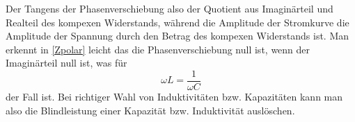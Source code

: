 Der Tangens der Phasenverschiebung also der Quotient aus Imaginärteil und Realteil des kompexen Widerstands, während die Amplitude der Stromkurve die Amplitude der Spannung durch den Betrag des kompexen Widerstands ist.
Man erkennt in \ref{Zpolar} leicht das die Phasenverschiebung null ist, wenn der Imaginärteil null ist, was für 
\begin{equation}
\omega L = \frac{1}{\omega C}
\end{equation}
der Fall ist. Bei richtiger Wahl von Induktivitäten bzw. Kapazitäten kann man also die Blindleistung einer Kapazität bzw. Induktivität auslöschen.
